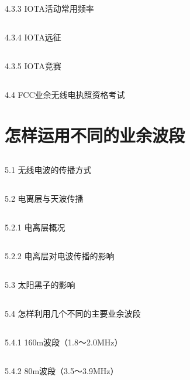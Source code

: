 \documentclass[12pt,UTF8]{ctexbook}
\begin{document}
\section{}4.3.3 IOTA活动常用频率
\section{}4.3.4 IOTA远征
\section{}4.3.5 IOTA竞赛
\section{}4.4 FCC业余无线电执照资格考试

\chapter{怎样运用不同的业余波段}

\section{}5.1 无线电波的传播方式
\section{}5.2 电离层与天波传播
\section{}5.2.1 电离层概况
\section{}5.2.2 电离层对电波传播的影响
\section{}5.3 太阳黑子的影响
\section{}5.4 怎样利用几个不同的主要业余波段
\section{}5.4.1 160m波段（1.8～2.0MHz）
\section{}5.4.2 80m波段（3.5～3.9MHz）
\end{document}
